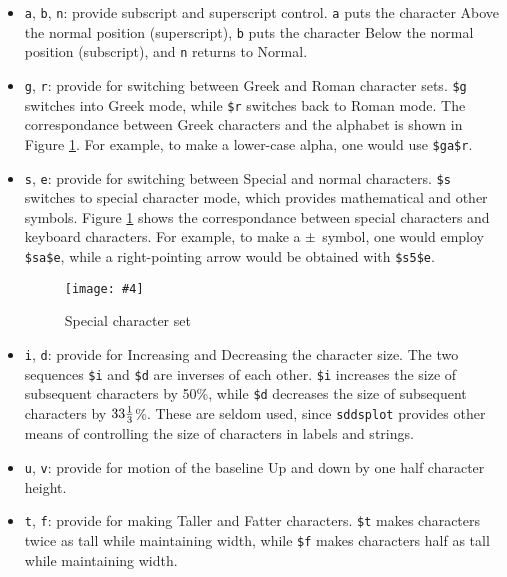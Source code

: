 \begin{itemize}
\begin{itemize}
\item {\tt a}, {\tt b}, {\tt n}: provide subscript and superscript control.  {\tt a} puts the character Above the
normal position (superscript), {\tt b} puts the character Below the normal position (subscript), and {\tt n}
returns to Normal.

\item {\tt g}, {\tt r}: provide for switching between Greek and Roman
character sets. \verb|$g| switches into Greek mode, while \verb|$r|
switches back to Roman mode.  The correspondance between Greek
characters and the alphabet is shown in Figure \ref{CharSet}.  For
example, to make a lower-case alpha, one would use \verb|$ga$r|.

\item {\tt s}, {\tt e}: provide for switching between Special and
normal characters.  \verb|$s| switches to special character mode,
which provides mathematical and other symbols.  Figure \ref{CharSet}
shows the correspondance between special characters and keyboard
characters.  For example, to make a ${\rm \pm}$ symbol, one would
employ \verb|$sa$e|, while a right-pointing arrow would be obtained
with \verb|$s5$e|.

\newcommand{\PSFigure}[4]{\begin{figure}[htb]
  \vspace{-0.38in}
  \texttt{[image: \#4]}
  \vspace{-0.57in}
  \caption[#2]{#2}\label{#3}
  \end{figure}}

\PSFigure{15cm}{Special character set}{CharSet}{charSet.eps}

\item {\tt i}, {\tt d}: provide for Increasing and Decreasing the
character size.  The two sequences \verb|$i| and \verb|$d| are
inverses of each other.  \verb|$i| increases the size of subsequent
characters by 50\%, while \verb|$d| decreases the size of subsequent
characters by ${\rm 33 \frac{1}{3}}$\%.  These are seldom used, since
{\tt sddsplot} provides other means of controlling the size of
characters in labels and strings.

\item {\tt u}, {\tt v}: provide for motion of the baseline Up and down by one half character height.  

\item {\tt t}, {\tt f}: provide for making Taller and Fatter characters.  \verb|$t| makes characters twice as
tall while maintaining width, while \verb|$f| makes characters half as tall while maintaining width.  


\end{itemize}
\end{itemize}
